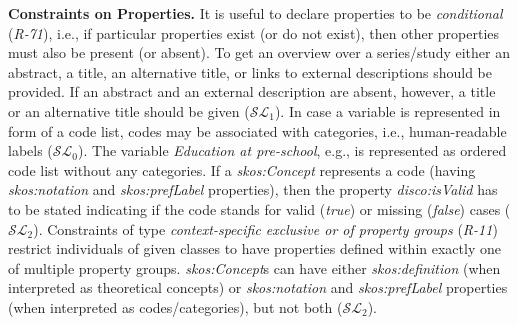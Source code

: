 \documentclass{llncs}
\begin{document}
\textbf{Constraints on Properties.}
It is useful to declare properties to be \emph{conditional} (\emph{R-71}), i.e., if particular properties exist (or do not exist), then other properties must also be present (or absent).
To get an overview over a series/study either an abstract, a title, an alternative title, or links to external descriptions should be provided. 
If an abstract and an external description are absent, however,  
a title or an alternative title should be given ($\mathcal{SL}_{1}$).
In case a variable is represented in form of a code list, codes may be associated with categories, i.e., human-readable labels ($\mathcal{SL}_{0}$).
The variable \emph{Education at pre-school}, e.g., is represented as ordered code list without any categories.
If a {\em skos:Concept} represents a code (having {\em skos:notation} and {\em skos:prefLabel} properties), 
then the property {\em disco:isValid} has to be stated indicating if the code stands for valid (\emph{true}) or missing (\emph{false}) cases ($\mathcal{SL}_{2}$).
Constraints of type \emph{context-specific exclusive or of property groups} (\emph{R-11})
restrict individuals of given classes to have properties defined within exactly one of multiple property groups.
\emph{skos:Concept}s can have either \emph{skos:definition} (when interpreted as theoretical concepts) or \emph{skos:notation} and \emph{skos:prefLabel} properties (when interpreted as codes/categories), but not both ($\mathcal{SL}_{2}$).
\end{document}
